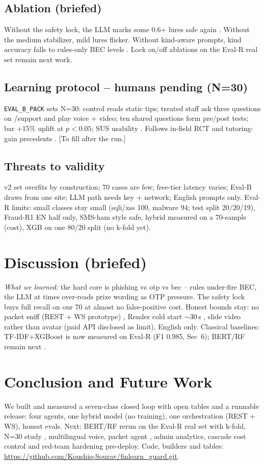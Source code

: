 \documentclass[11pt,a4paper]{article}
\begin{document}
\subsection{Ablation (briefed)}
Without the safety lock, the LLM marks some 0.6+ lures safe again \cite{Hasan25}. Without the medium stabilizer, mild lures flicker. Without kind-aware prompts, kind accuracy falls to rules-only BEC levels \cite{Ji25,CLASP25}. Lock on/off ablations on the Eval-R real set remain next work.

\subsection{Learning protocol -- humans pending (N=30)}
\texttt{EVAL\_B\_PACK} sets N=30: control reads static tips; treated staff ask three questions on /support and play voice + video; ten shared questions form pre/post tests; bar +15\% uplift at $p<0.05$; SUS usability \cite{EvalMethod24}. Follows in-field RCT and tutoring-gain precedents \cite{Vanzo25,Greco25,Pardos24,TutorCopilot24}. [To fill after the run.]

\subsection{Threats to validity}
v2 set overfits by construction; 70 cases are few; free-tier latency varies; Eval-B draws from one site; LLM path needs key + network; English prompts only. Eval-R limits: small classes stay small (sqli/xss 100, malware 94; test split 20/20/19), Fraud-R1 EN half only, SMS-ham style safe, hybrid measured on a 70-sample (cost), XGB on one 80/20 split (no k-fold yet).

\section{Discussion (briefed)}
\textit{What we learned:} the hard core is phishing vs otp vs bec -- rules under-fire BEC, the LLM at times over-reads prize wording as OTP pressure. The safety lock buys full recall on our 70 at almost no false-positive cost. Honest bounds stay: no packet sniff (REST + WS prototype) \cite{Rigaki24,Castro25}, Render cold start $\sim$30\,s \cite{Docker24}, slide video rather than avatar (paid API disclosed as limit), English only. Classical baselines: TF-IDF+XGBoost is now measured on Eval-R (F1 0.985, Sec~6); BERT/RF remain next \cite{Algo25,FinFraud25,BERT24}.

\section{Conclusion and Future Work}
We built and measured a seven-class closed loop with open tables and a runnable release: four agents, one hybrid model (no training), one orchestration (REST + WS), honest evals. Next: BERT/RF rerun on the Eval-R real set with k-fold, N=30 study \cite{Vanzo25,EvalMethod24}, multilingual voice, packet agent \cite{Rigaki24}, admin analytics, cascade cost control \cite{CLASP25} and red-team hardening \cite{SecEval225,AgentHarm25} pre-deploy. Code, builders and tables: \url{https://github.com/Koushiq-Sourav/finlearn_guard.git}.
\end{document}
